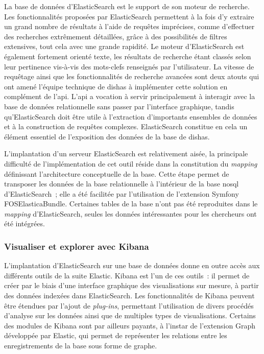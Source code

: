 \documentclass[a4paper,12pt,twoside]{book}
\newcommand{\eng}{\emph}
\newcommand{\bdd}{base de données\xspace}
\newcommand{\dishas}{\gls{dishas}\xspace}
\newcommand{\api}{\gls{api}\xspace}
\newcommand{\nosql}{\gls{nosql}\xspace}
\begin{document}
La \bdd d'ElasticSearch est le support de son moteur de recherche. Les fonctionnalités proposées par ElasticSearch permettent à la fois d'y extraire un grand nombre de résultats à l'aide de requêtes imprécises, comme d'effectuer des recherches extrêmement détaillées, grâce à des possibilités de filtres extensives, tout cela avec une grande rapidité. Le moteur d'ElasticSearch est également fortement orienté texte, les résultats de recherche étant classés selon leur pertinence vis-à-vis des mots-clefs renseignés par l'utilisateur. La vitesse de requêtage ainsi que les fonctionnalités de recherche avancées sont deux atouts qui ont amené l'équipe technique de \dishas à implémenter cette solution en complément de l'\api. L'\api a vocation à servir principalement à interagir avec la \bdd relationnelle sans passer par l'interface graphique, tandis qu'ElasticSearch doit être utile à l'extraction d'importants ensembles de données et à la construction de requêtes complexes. ElasticSearch constitue en cela un élément essentiel de l'exposition des données de la base de \dishas.

L'implantation d'un serveur ElasticSearch est relativement aisée, la principale difficulté de l'implémentation de cet outil réside dans la constitution du \eng{mapping} définissant l'architecture conceptuelle de la base. Cette étape permet de transposer les données de la base relationnelle à l'intérieur de la base \nosql d'ElasticSearch~; elle a été facilitée par l'utilisation de l'extension Symfony FOSElasticaBundle. Certaines tables de la base n'ont pas été reproduites dans le \eng{mapping} d'ElasticSearch, seules les données intéressantes pour les chercheurs ont été intégrées.

			\subsubsection{Visualiser et explorer avec Kibana}
L'implantation d'ElasticSearch sur une base de données donne en outre accès aux différents outils de la suite Elastic. Kibana est l'un de ces outils~: il permet de créer par le biais d'une interface graphique des visualisations sur mesure, à partir des données indexées dans ElasticSearch. Les fonctionnalités de Kibana peuvent être étendues par l'ajout de \eng{plug-ins}, permettant l'utilisation de divers procédés d'analyse sur les données ainsi que de multiples types de visualisations. Certains des modules de Kibana sont par ailleurs payants, à l'instar de l'extension Graph développée par Elastic, qui permet de représenter les relations entre les enregistrements de la base sous forme de graphe.
\end{document}
